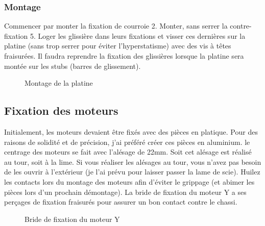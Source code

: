 \subsubsection{Montage}%
Commencer par monter la fixation de courroie 2. Monter, sans serrer la contre-fixation 5. Loger les glissière dans leurs fixations et visser ces dernières sur la %
platine (sans trop serrer pour éviter l'hyperstatisme) avec des vis à têtes fraisurées. Il faudra reprendre la fixation des glissières lorsque la platine sera montée %
sur les stubs (barres de glissement).
\begin{figure}%
   \caption{\label{plate-assy} Montage de la platine}%
\end{figure}%
\subsection{Fixation des moteurs}%
Initialement, les moteurs devaient être fixés avec des pièces en platique. Pour des raisons de solidité et de précision, j'ai préféré créer ces pièces en aluminium. %
le centrage des moteurs se fait avec l'alésage de 22mm. Soit cet alésage est réalisé au tour, soit à la lime. Si vous réaliser les alésages au tour, vous n'avez %
pas besoin de les ouvrir à l'extérieur (je l'ai prévu pour laisser passer la lame de scie). Huilez les contacts lors du montage des moteurs afin d'éviter le grippage %
(et abimer les pièces lors d'un prochain démontage). %
La bride de fixation du moteur Y a ses perçages de fixation fraisurés pour assurer un bon contact contre le chassi.
\begin{figure}%
   \caption{\label{y-motor-bracket} Bride de fixation du moteur Y}%
\end{figure}%